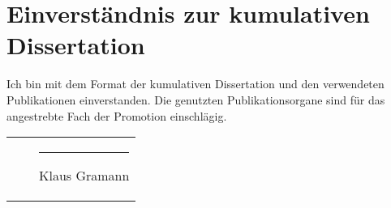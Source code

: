 \documentclass[a4paper,11pt]{article}
\begin{document}
\thispagestyle{empty}

\section*{Einverständnis zur kumulativen Dissertation}

Ich bin mit dem Format der kumulativen Dissertation und den verwendeten Publikationen einverstanden. Die genutzten Publikationsorgane sind für das angestrebte Fach der Promotion einschlägig.

\begin{tabularx}{\textwidth}{XXX}
& & \vspace{2cm} \hrule Klaus Gramann \\
\end{tabularx}
\end{document}
